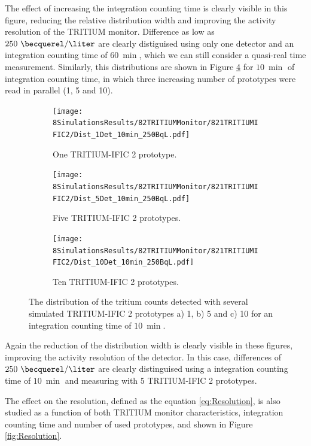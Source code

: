 The effect of increasing the integration counting time is clearly visible in this figure, reducing the relative distribution width and improving the activity resolution of the TRITIUM monitor. Difference as low as $250~\becquerel/\liter$ are clearly distiguised using only one detector and an integration counting time of $60~\min$, which we can still consider a quasi-real time measurement. Similarly, this distributions are shown in Figure \ref{fig:SeveralDet250BqL10min} for $10~\min$ of integration counting time, in which three increasing number of prototypes were read in parallel (1, 5 and 10).

\begin{figure}
\centering
    \begin{subfigure}[b]{0.6\textwidth}
    \centering
    \texttt{[image: 8SimulationsResults/82TRITIUMMonitor/821TRITIUMIFIC2/Dist\_1Det\_10min\_250BqL.pdf]}  
    \caption{One TRITIUM-IFIC 2 prototype.\label{subfig:1Det10min250BqLSD}}
    \end{subfigure}
    \hfill
    \begin{subfigure}[b]{0.6\textwidth}
    \centering
    \texttt{[image: 8SimulationsResults/82TRITIUMMonitor/821TRITIUMIFIC2/Dist\_5Det\_10min\_250BqL.pdf]}  
    \caption{Five TRITIUM-IFIC 2 prototypes.\label{subfig:5Det10min250BqLSD}}
    \end{subfigure}
    \hfill
    \begin{subfigure}[b]{0.6\textwidth}
    \centering
    \texttt{[image: 8SimulationsResults/82TRITIUMMonitor/821TRITIUMIFIC2/Dist\_10Det\_10min\_250BqL.pdf]}  
    \caption{Ten TRITIUM-IFIC 2 prototypes.\label{subfig:10Det10min250BqLSD}}
    \end{subfigure}
 \caption{The distribution of the tritium counts detected with several simulated TRITIUM-IFIC 2 prototypes a) 1, b) 5 and c) 10 for an integration counting time of $10~\min$.}
 \label{fig:SeveralDet250BqL10min}
\end{figure}

Again the reduction of the distribution width is clearly visible in these figures, improving the activity resolution of the detector. In this case, differences of $250~\becquerel/\liter$ are clearly distinguised using a integration counting time of $10~\min$ and measuring with 5 TRITIUM-IFIC 2 prototypes. 

The effect on the resolution, defined as the equation \ref{eq:Resolution}, is also studied as a function of both TRITIUM monitor characteristics, integration counting time and number of used prototypes, and shown in Figure \ref{fig:Resolution}.

